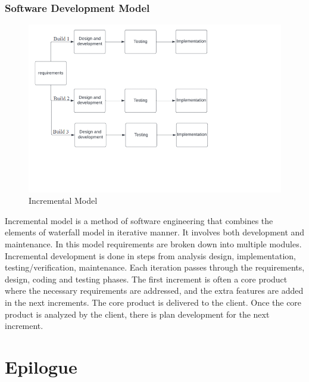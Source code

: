 \subsection{Software Development Model}
\vspace{-18pt}
 \begin{figure}[tbh] %
\begin{center}
	\includegraphics[width=8in]{images/sdlc1.png} 
	\caption{Incremental Model} %
	\label{Incremental Model} %
\end{center}
\end{figure}
 Incremental model is a method of software engineering that combines the elements of waterfall model in iterative manner. It involves both development and maintenance. In this model requirements are broken down into multiple modules. Incremental development is done in steps from analysis design, implementation, testing/verification, maintenance. Each iteration passes through the requirements, design, coding and testing phases. The first increment is often a core product where the necessary requirements are addressed, and the extra features are added in the next increments. The core product is delivered to the client. Once the core product is analyzed by the client, there is plan development for the next increment.\\
\chapter{Epilogue}
\vspace{-18pt}
